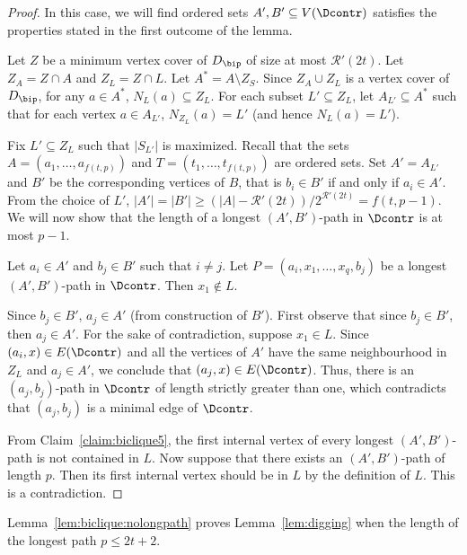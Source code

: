 \begin{proof}
 In this case, 
we will find ordered sets $A',B' \subseteq V(\Dcontr)$ satisfies the properties stated in the first outcome of the lemma.

Let $Z$ be a minimum vertex cover of $D_{\bip}$ of size at most $\mathcal{R}'(2t)$. Let $Z_A = Z \cap A$ and 
$Z_L=Z \cap L$. Let $A^*=A \setminus Z_S$. Since $Z_A \cup Z_L$ is a vertex cover of $D_{\bip}$, for any  $a \in A^*$, $N_L(a) \subseteq Z_L$.
For each subset $L' \subseteq Z_L$, let $A_{L'} \subseteq A^*$ such that for each vertex $a \in A_{L'}$, $N_{Z_L}(a)=L'$ (and hence $N_L(a)=L'$).

Fix $L' \subseteq Z_L$ such that $|S_{L'}|$ is maximized. 
Recall that the sets $A =(a_1,\ldots,a_{f(t,p)})$ and $T=(t_1, \ldots, t_{f(t,p)})$ are ordered sets.
Set $A'=A_{L'}$ and $B'$ be the corresponding vertices of $B$, 
that is $b_i \in B'$ if and only if $a_i \in A'$.
From the choice of $L'$, $|A'|=|B'| \geq (|A|-\mathcal{R}'(2t))/2^{\mathcal{R}'(2t)} = f(t,p-1)$.
We will now show that the length of a longest $(A',B')$-path in $\Dcontr$ is at most $p-1$. 

\begin{claim}\label{claim:biclique5}
Let $a_i \in A'$ and $b_j \in B'$ such that $i \neq j$. Let $P=(a_i,x_1,\ldots,x_q,b_j)$ be a longest $(A',B')$-path in $\Dcontr$. Then $x_1 \not \in L$.
\end{claim}
\begin{claimproof}
Since $b_j \in B'$, $a_j \in A'$ (from construction of $B'$).
First observe that since $b_j \in B'$, then $a_j \in A'$.
For the sake of contradiction, suppose $x_1 \in L$. Since $(a_i,x) \in E(\Dcontr)$ and all the vertices of $A'$ have the same neighbourhood in $Z_L$ and $a_j \in A'$, we conclude that $(a_j,x) \in E(\Dcontr)$. Thus, there is an $(a_j,b_j)$-path in $\Dcontr$ of length strictly greater than one, which contradicts that $(a_j,b_j)$ is a minimal edge of $\Dcontr$.
\end{claimproof}

From Claim~\ref{claim:biclique5}, the first internal vertex of every longest $(A',B')$-path is not contained in $L$. Now suppose that there exists an $(A',B')$-path of length $p$. Then its first internal vertex should be in $L$ by the definition of $L$. This is a contradiction.  
\end{proof}

Lemma~\ref{lem:biclique:nolongpath} proves Lemma~\ref{lem:digging} when the length of the longest path $p \leq 2t+2$.